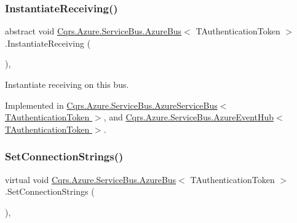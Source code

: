 \mbox{\label{classCqrs_1_1Azure_1_1ServiceBus_1_1AzureBus_ac9f66dd531dcde49be72ba8f2cb28e9b_ac9f66dd531dcde49be72ba8f2cb28e9b}} 
\subsubsection{\texorpdfstring{Instantiate\+Receiving()}{InstantiateReceiving()}}
{\footnotesize\ttfamily abstract void \hyperlink{classCqrs_1_1Azure_1_1ServiceBus_1_1AzureBus}{Cqrs.\+Azure.\+Service\+Bus.\+Azure\+Bus}$<$ T\+Authentication\+Token $>$.Instantiate\+Receiving (\begin{DoxyParamCaption}{ }\end{DoxyParamCaption})\hspace{0.3cm}{\ttfamily [protected]}, {}}



Instantiate receiving on this bus. 



Implemented in \hyperlink{classCqrs_1_1Azure_1_1ServiceBus_1_1AzureServiceBus_ad49a2d063279ec98443e7f1d69178cfa_ad49a2d063279ec98443e7f1d69178cfa}{Cqrs.\+Azure.\+Service\+Bus.\+Azure\+Service\+Bus$<$ T\+Authentication\+Token $>$}, and \hyperlink{classCqrs_1_1Azure_1_1ServiceBus_1_1AzureEventHub_aa725781eddb65bdfe456a4fecb36fb6b_aa725781eddb65bdfe456a4fecb36fb6b}{Cqrs.\+Azure.\+Service\+Bus.\+Azure\+Event\+Hub$<$ T\+Authentication\+Token $>$}.

\mbox{\label{classCqrs_1_1Azure_1_1ServiceBus_1_1AzureBus_a8a1be9145b0a92c0037ef1b8b4cc79d9_a8a1be9145b0a92c0037ef1b8b4cc79d9}} 
\subsubsection{\texorpdfstring{Set\+Connection\+Strings()}{SetConnectionStrings()}}
{\footnotesize\ttfamily virtual void \hyperlink{classCqrs_1_1Azure_1_1ServiceBus_1_1AzureBus}{Cqrs.\+Azure.\+Service\+Bus.\+Azure\+Bus}$<$ T\+Authentication\+Token $>$.Set\+Connection\+Strings (\begin{DoxyParamCaption}{ }\end{DoxyParamCaption})\hspace{0.3cm}{\ttfamily [protected]}, {\ttfamily [virtual]}}



